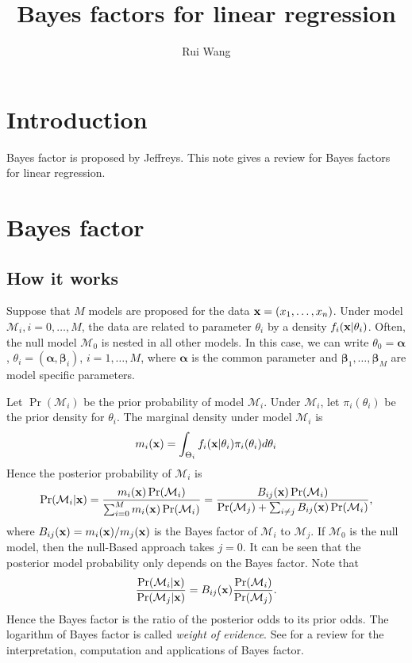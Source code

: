 \documentclass[11pt]{article}
\title{Bayes factors for linear regression}
\author[1]{Rui Wang}
\newcommand{\bfsym}[1]{\ensuremath{\boldsymbol{#1}}}
\def\balpha{\bfsym \alpha}
\def\bbeta{\bfsym \beta}
\theoremstyle{plain}
\theoremstyle{definition}
\theoremstyle{remark}
\begin{document}
\maketitle
\section{Introduction}
Bayes factor is proposed by Jeffreys.
This note gives a review for Bayes factors for linear regression.
\section{Bayes factor}
\subsection{How it works}
Suppose that $M$ models are proposed for the data $\mathbf{x}=(x_1,\ldots, x_n)$.
Under model $\mathcal M_i, i=0,\ldots, M$, the data are related to parameter $\theta_i$ by a density $f_i(\mathbf{x} | \theta_i)$.
Often, the null model $\mathcal M_0$ is nested in all other models.
In this case, we can write $\theta_0= \balpha$, $\theta_i=(\balpha,\bbeta_i)$, $i=1,\ldots, M$, where $\balpha$ is the common parameter and $\bbeta_1,\ldots,\bbeta_{M}$ are model specific parameters.

Let $\Pr(\mathcal M_i)$ be the prior probability of model $\mathcal M_i$.
Under $\mathcal M_i$, let $\pi_i (\theta_i)$ be the prior density for $\theta_i$.
The marginal density under model $\mathcal M_i$ is
\begin{equation*}
    m_i (\mathbf{x}) = \int_{\Theta_i} f_i(\mathbf{x} |\theta_i) \pi_i( \theta_i ) d \theta_i
\end{equation*}
Hence the posterior probability of $\mathcal M_i$ is
\begin{equation*}
    \Pr(\mathcal M_i |\mathbf{x}) = \frac{m_i(\mathbf{x})\Pr(\mathcal M_i)}{\sum_{i=0}^{M} m_i(\mathbf{x})\Pr (\mathcal M_i)}
    =
    \frac{B_{ij}(\mathbf{x})\Pr(\mathcal M_i)}{\Pr(\mathcal M_j)+\sum_{i\neq j} B_{ij}(\mathbf{x})\Pr (\mathcal M_i)}
    ,
\end{equation*}
where $B_{ij}(\mathbf{x}) = m_i(\mathbf{x})/m_j(\mathbf{x})$ is the Bayes factor of $\mathcal M_i$ to $\mathcal M_j$.
If $\mathcal M_0$ is the null model, then the null-Based approach takes $j=0$.
It can be seen that the posterior model probability only depends on the Bayes factor.
Note that
\begin{equation*}
    \frac{\Pr(\mathcal M_i | \mathbf{x})}{\Pr (\mathcal M_j|\mathbf{x})} = B_{ij}(\mathbf{x}) \frac{\Pr (\mathcal M_i)}{\Pr(\mathcal M_j)}.
\end{equation*}
Hence the Bayes factor is the ratio of the posterior odds to its prior odds.
The logarithm of Bayes factor is called \emph{weight of evidence}.
See \cite{Robert1995Bayes} for a review for the interpretation, computation and applications of Bayes factor.
\end{document}
